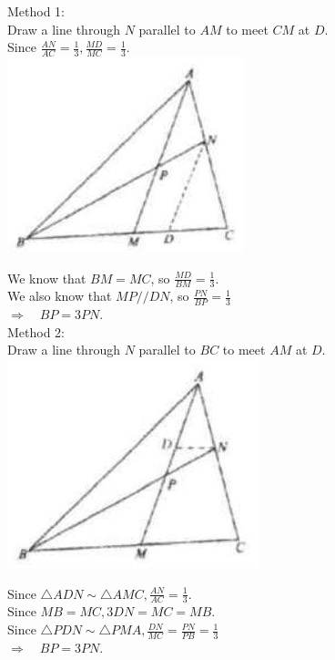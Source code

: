 \documentclass{article}
\begin{document}
Method 1:\\
Draw a line through \(N\) parallel to \(A M\) to meet \(C M\) at \(D\).\\
Since \(\frac{A N}{A C}=\frac{1}{3}, \frac{M D}{M C}=\frac{1}{3}\).\\
\centering
\includegraphics[width=\textwidth]{images/139.jpg}

We know that \(B M=M C\), so \(\frac{M D}{B M}=\frac{1}{3}\).\\
We also know that \(M P / / D N\), so \(\frac{P N}{B P}=\frac{1}{3}\)\\
\(\Rightarrow \quad B P=3 P N\).\\
Method 2:\\
Draw a line through \(N\) parallel to \(B C\) to meet \(A M\) at \(D\).\\
\centering
\includegraphics[width=\textwidth]{images/139(2).jpg}

Since \(\triangle A D N \sim \triangle A M C, \frac{A N}{A C}=\frac{1}{3}\).\\
Since \(M B=M C, 3 D N=M C=M B\).\\
Since \(\triangle P D N \sim \triangle P M A, \frac{D N}{M C}=\frac{P N}{P B}=\frac{1}{3}\)\\
\(\Rightarrow \quad B P=3 P N\).
\end{document}
